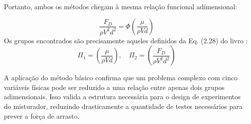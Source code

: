 Portanto, ambos os métodos chegam à mesma relação funcional adimensional:

\begin{equation*}
    \frac{F_D}{\rho V^2 d^2} = \Phi \left( \frac{\mu}{\rho V d} \right)
\end{equation*}
Os grupos encontrados são precisamente aqueles definidos da {Eq. (2.28)} do livro \cite{PMMDym2004}:
\begin{equation*}
    \Pi_1 = \left( \frac{\mu}{\rho V d} \right), \quad \Pi_2 = \left( \frac{F_D}{\rho V^2 d^2} \right)
\end{equation*}

A aplicação do método básico confirma que um problema complexo com cinco variáveis físicas pode ser reduzido a uma relação entre apenas dois grupos adimensionais. Isso valida a estrutura necessária para o design de experimentos do misturador, reduzindo drasticamente a quantidade de testes necessários para prever a força de arrasto.

